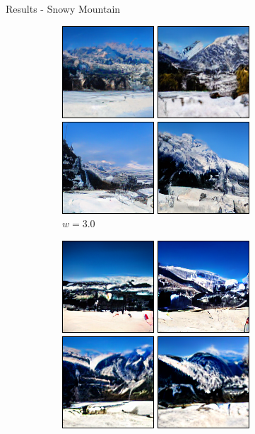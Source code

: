 \documentclass[11pt]{beamer}
\begin{document}
\begin{frame}{Results - Snowy Mountain}
\begin{figure}
\begin{subfigure}[b]{0.24\textwidth}
        \includegraphics[width=\linewidth]{figures/a_beautiful_snowy_mountain_landscape_3.png}
        \caption{$w=3.0$}
      \end{subfigure}
      \vspace{0.5em}
      \begin{subfigure}[b]{0.24\textwidth}
        \includegraphics[width=\linewidth]{figures/a_beautiful_snowy_mountain_landscape_5.png}

\end{subfigure}
\end{figure}
\end{frame}
\end{document}
